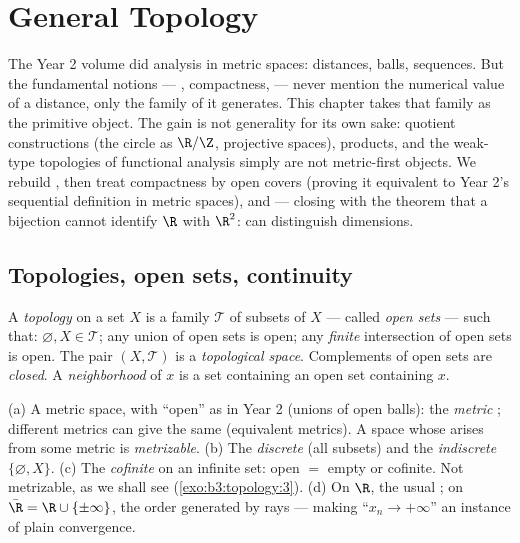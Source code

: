 \chapter{General Topology}\label{ch:b3:topology}

The Year 2 volume did analysis in metric spaces: distances,
balls, sequences. But the fundamental notions --- ,
compactness,  --- never mention the numerical value
of a distance, only the family of \emph{} it generates.
This chapter takes that family as the primitive object. The gain
is not generality for its own sake: quotient constructions (the
circle as $\R/\Z$, projective spaces), products, and the
weak-type topologies of functional analysis simply are not
metric-first objects. We rebuild , then treat
compactness by open covers (proving it equivalent to Year 2's
sequential definition in metric spaces), and  ---
closing with the theorem that a  bijection cannot
identify $\R$ with $\R^2$:  can distinguish dimensions.

\section{Topologies, open sets, continuity}

\begin{definition}\label{def:b3:topology:topology}
A \emph{topology} on a set $X$ is a family
$\mathcal T$ of subsets of $X$ --- called \emph{open
sets} --- such that: $\varnothing, X \in
\mathcal T$; any union of open sets is open; any \emph{finite}
intersection of open sets is open. The pair $(X, \mathcal T)$ is
a \emph{topological space}. Complements of open sets are
\emph{closed}. A \emph{neighborhood} of $x$
is a set containing an open set containing $x$.
\end{definition}

\begin{example}\label{ex:b3:topology:examples}
(a) A metric space, with ``open'' as in Year 2 (unions of open
balls): the \emph{metric }; different metrics can give
the same  (equivalent metrics). A space whose 
arises from some metric is \emph{metrizable}.
(b) The \emph{discrete}  (all subsets) and the
\emph{indiscrete}  $\{\varnothing, X\}$.
(c) The \emph{cofinite}  on an infinite set: open $=$
empty or cofinite. Not metrizable, as we shall see
(\cref{exo:b3:topology:3}).
(d) On $\R$, the usual ; on $\bar\R = \R \cup
\{\pm\infty\}$, the order  generated by rays --- making
``$x_n \to +\infty$'' an instance of plain convergence.
\end{example}

